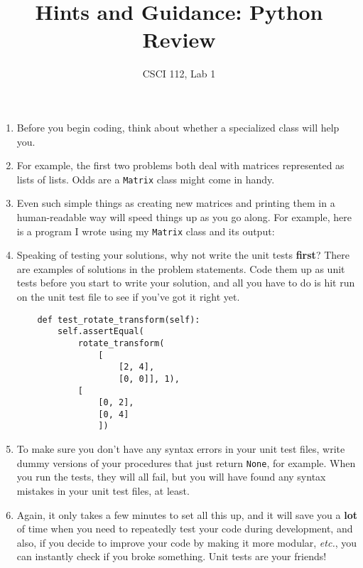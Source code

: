 \documentclass[12pt]{article}
\title{Hints and Guidance: Python Review}
\author{CSCI 112, Lab 1}
\date{}
\newcommand{\li}{\item}
\begin{document}
\sloppy

\maketitle
\begin{enumerate}
\li Before you begin coding, think about whether a specialized class 
will help you. 
\li For example, the first two problems both deal with matrices represented as
lists of lists.  Odds are a \lstinline{Matrix} class might come in handy.
\li Even such simple things as creating new matrices and printing them in a
human-readable way will speed things up as you go along.  For example,
here is a program I wrote using my \lstinline{Matrix} class and its output:
\li 
\begin{multicols}{2}
Speaking of testing your solutions, why not write the unit tests {\bf first}?
There are examples of solutions in the problem statements.  Code them up
as unit tests before you start to write your solution, 
and all you have to do is hit run on the unit test file to see if you've got it right
yet.
\columnbreak
\begin{lstlisting}
    def test_rotate_transform(self):
        self.assertEqual(
            rotate_transform(
                [
                    [2, 4],
                    [0, 0]], 1),
            [
                [0, 2],
                [0, 4]
                ])
\end{lstlisting}
\end{multicols}
\li To make sure you don't have any syntax errors in your unit test files, write 
dummy versions of your procedures that just return \lstinline{None}, for example.
When you run the tests, they will all fail, but you will have found any syntax mistakes
in your unit test files, at least.
\li Again, it only takes a few minutes to set all this up, and it will save you a {\bf lot} of time
when you need to repeatedly test your code during development, and also, if you
decide to improve your code by making it more modular, {\em etc.}, you can instantly
check if you broke something.  Unit tests are your friends!


\end{enumerate}
\end{document}
